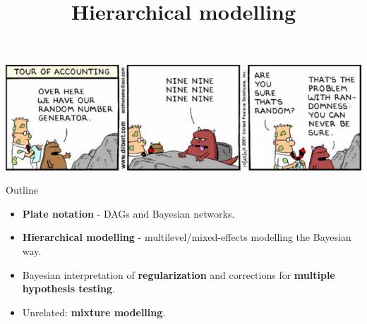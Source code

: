 

\usetikzlibrary{bayesnet}


\title[Hierarchical modelling]{Hierarchical modelling}



\begin{frame}

\bigskip

\bigskip

\bigskip

\centering

\includegraphics[width=0.90\linewidth]{../LectureAssets/L07/Lecture07cartoon}

\bigskip

\end{frame}




\begin{frame}{Outline}

\begin{itemize}\itemsep1.5em

\item \textbf{Plate notation} - DAGs and Bayesian networks.

\item  \textbf{Hierarchical modelling} - multilevel/mixed-effects modelling the Bayesian way.

\item  Bayesian interpretation of \textbf{regularization} and corrections for \textbf{multiple hypothesis testing}.

\item  Unrelated: \textbf{mixture modelling}.

\end{itemize}
\end{frame}

